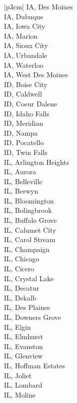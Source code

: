\begin{customLongTable}{ |p{3cm}| }
IA, Des Moines \\ \hline
IA, Dubuque \\ \hline
IA, Iowa City \\ \hline
IA, Marion \\ \hline
IA, Sioux City \\ \hline
IA, Urbandale \\ \hline
IA, Waterloo \\ \hline
IA, West Des Moines \\ \hline
ID, Boise City \\ \hline
ID, Caldwell \\ \hline
ID, Coeur Dalene \\ \hline
ID, Idaho Falls \\ \hline
ID, Meridian \\ \hline
ID, Nampa \\ \hline
ID, Pocatello \\ \hline
ID, Twin Falls \\ \hline
IL, Arlington Heights \\ \hline
IL, Aurora \\ \hline
IL, Belleville \\ \hline
IL, Berwyn \\ \hline
IL, Bloomington \\ \hline
IL, Bolingbrook \\ \hline
IL, Buffalo Grove \\ \hline
IL, Calumet City \\ \hline
IL, Carol Stream \\ \hline
IL, Champaign \\ \hline
IL, Chicago \\ \hline
IL, Cicero \\ \hline
IL, Crystal Lake \\ \hline
IL, Decatur \\ \hline
IL, Dekalb \\ \hline
IL, Des Plaines \\ \hline
IL, Downers Grove \\ \hline
IL, Elgin \\ \hline
IL, Elmhurst \\ \hline
IL, Evanston \\ \hline
IL, Glenview \\ \hline
IL, Hoffman Estates \\ \hline
IL, Joliet \\ \hline
IL, Lombard \\ \hline
IL, Moline \\ \hline

\end{customLongTable}
